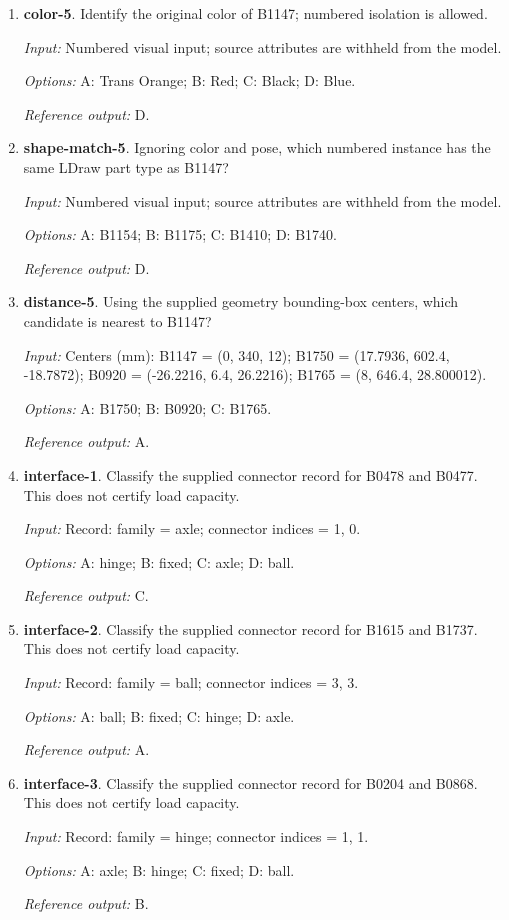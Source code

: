 \begin{enumerate}
\item \textbf{color-5}. Identify the original color of B1147; numbered isolation is allowed.\par {\small \textit{Input:} Numbered visual input; source attributes are withheld from the model. \par\textit{Options:} A: Trans Orange; B: Red; C: Black; D: Blue. \par\textit{Reference output:} D.}
\item \textbf{shape-match-5}. Ignoring color and pose, which numbered instance has the same LDraw part type as B1147?\par {\small \textit{Input:} Numbered visual input; source attributes are withheld from the model. \par\textit{Options:} A: B1154; B: B1175; C: B1410; D: B1740. \par\textit{Reference output:} D.}
\item \textbf{distance-5}. Using the supplied geometry bounding-box centers, which candidate is nearest to B1147?\par {\small \textit{Input:} Centers (mm): B1147 = (0, 340, 12); B1750 = (17.7936, 602.4, -18.7872); B0920 = (-26.2216, 6.4, 26.2216); B1765 = (8, 646.4, 28.800012). \par\textit{Options:} A: B1750; B: B0920; C: B1765. \par\textit{Reference output:} A.}
\item \textbf{interface-1}. Classify the supplied connector record for B0478 and B0477. This does not certify load capacity.\par {\small \textit{Input:} Record: family = axle; connector indices = 1, 0. \par\textit{Options:} A: hinge; B: fixed; C: axle; D: ball. \par\textit{Reference output:} C.}
\item \textbf{interface-2}. Classify the supplied connector record for B1615 and B1737. This does not certify load capacity.\par {\small \textit{Input:} Record: family = ball; connector indices = 3, 3. \par\textit{Options:} A: ball; B: fixed; C: hinge; D: axle. \par\textit{Reference output:} A.}
\item \textbf{interface-3}. Classify the supplied connector record for B0204 and B0868. This does not certify load capacity.\par {\small \textit{Input:} Record: family = hinge; connector indices = 1, 1. \par\textit{Options:} A: axle; B: hinge; C: fixed; D: ball. \par\textit{Reference output:} B.}

\end{enumerate}
